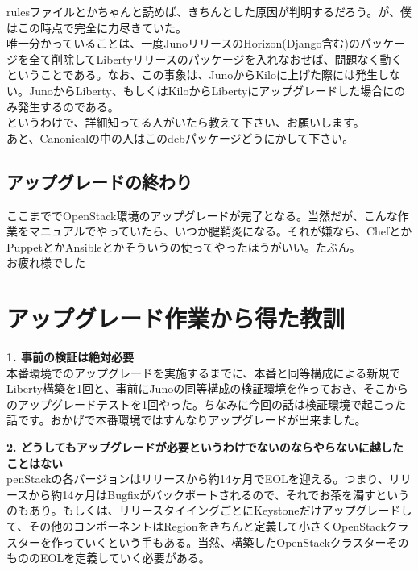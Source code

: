 \documentclass[9pt,b5paper,tombo,openany]{jsbook}
\begin{document}
rulesファイルとかちゃんと読めば、きちんとした原因が判明するだろう。が、僕はこの時点で完全に力尽きていた。\\[1ex]

唯一分かっていることは、一度JunoリリースのHorizon(Django含む)のパッケージを全て削除してLibertyリリースのパッケージを入れなおせば、問題なく動くということである。なお、この事象は、JunoからKiloに上げた際には発生しない。JunoからLiberty、もしくはKiloからLibertyにアップグレードした場合にのみ発生するのである。\\[1ex]

\noindent
というわけで、詳細知ってる人がいたら教えて下さい、お願いします。\\[1ex]

\noindent
あと、Canonicalの中の人はこのdebパッケージどうにかして下さい。\\[1ex]

\subsection{アップグレードの終わり}
ここまででOpenStack環境のアップグレードが完了となる。当然だが、こんな作業をマニュアルでやっていたら、いつか腱鞘炎になる。それが嫌なら、ChefとかPuppetとかAnsibleとかそういうの使ってやったほうがいい。たぶん。\\[1ex]

\noindent
お疲れ様でした

\section{アップグレード作業から得た教訓}
\noindent
\textbf{1. 事前の検証は絶対必要}\\[1ex]

本番環境でのアップグレードを実施するまでに、本番と同等構成による新規でLiberty構築を1回と、事前にJunoの同等構成の検証環境を作っておき、そこからのアップグレードテストを1回やった。ちなみに今回の話は検証環境で起こった話です。おかげで本番環境ではすんなりアップグレードが出来ました。

\noindent
\textbf{2. どうしてもアップグレードが必要というわけでないのならやらないに越したことはない}\\[1ex]

penStackの各バージョンはリリースから約14ヶ月でEOLを迎える。つまり、リリースから約14ヶ月はBugfixがバックポートされるので、それでお茶を濁すというのもあり。もしくは、リリースタイイングごとにKeystoneだけアップグレードして、その他のコンポーネントはRegionをきちんと定義して小さくOpenStackクラスターを作っていくという手もある。当然、構築したOpenStackクラスターそのもののEOLを定義していく必要がある。
\end{document}
